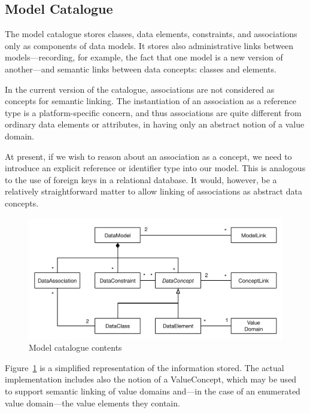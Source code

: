 \subsection{Model Catalogue}

The model catalogue stores classes, data elements, constraints, and
associations only as components of data models.  It stores also
administrative links between models---recording, for example, the fact
that one model is a new version of another---and semantic links
between data concepts: classes and elements.  

In the current version of the catalogue, associations are not
considered as concepts for semantic linking.  The instantiation of an
association as a reference type is a platform-specific concern, and
thus associations are quite different from ordinary data elements or
attributes, in having only an abstract notion of a value domain.  

At present, if we wish to reason about an association as a concept, we
need to introduce an explicit reference or identifier type into our
model.  This is analogous to the use of foreign keys in a relational
database.  It would, however, be a relatively straightforward matter
to allow linking of associations as abstract data concepts. 

\begin{figure}[h]
  \centering
  \includegraphics[width=\columnwidth]{ASEFigs/modelCatalogueContents}
  \caption{Model catalogue contents}
  \label{fig:catalogueContents}
\end{figure}

Figure~\ref{fig:catalogueContents} is a simplified representation of
the information stored.  The actual implementation includes also the
notion of a \textsf{ValueConcept}, which may be used to support
semantic linking of value domains and---in the case of an enumerated
value domain---the value elements they contain.

